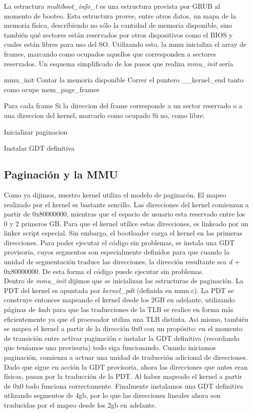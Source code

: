 La estructura \textit{multiboot\_info\_t} es una estructura provista por GRUB al momento de booteo. Esta estructura provee, entre otros datos, un mapa de la memoria física, describiendo 
no sólo la cantidad de memoria disponible, sino también qué sectores están reservados por otros dispositivos como el BIOS y cuales están libres para uso del SO. Utilizando esto, la mmu 
inicializa el array de frames, marcando como ocupados aquellos que corresponden a sectores reservados. Un esquema simplificado de los pasos que realiza \textit{mmu\_init} sería

\begin{verbatimtab}
 mmu_init
      Contar la memoria disponible
      Correr el puntero __kernel_end tanto como ocupe mem_page_frames

      Para cada frame
	  Si la direccion del frame corresponde a un sector reservado
	  o a una direccion del kernel, marcarlo como ocupado
	  Si no, como libre.

      Inicializar paginacion

      Instalar GDT definitiva
\end{verbatimtab}

\subsection{Paginación y la MMU}
Como ya dijimos, nuestro kernel utiliza el modelo de paginacón. El mapeo realizado por el kernel es bastante sencillo. Las direcciones del kernel comienzan a partir de 0x80000000, mientras que 
el espacio de usuario esta reservado entre los 0 y 2 primeros GB. Para que el kernel utilice estas direcciones, es linkeado por un linker script especial. Sin embargo, el bootloader carga 
el kernel en las primeras direcciones. Para poder ejecutar el código sin problemas, se instala una GDT provisoria, cuyos segmentos son especialmente definidos para que cuando la unidad de segmentación 
traduce las direcciones, la dirección resultante sea \textit{d} + 0x80000000. De esta forma el código puede ejecutar sin problemas.\\
Dentro de \textit{mmu\_init} dijimos que se inicializan las estructuras de paginación. La PDT del kernel es apuntada por \textit{kernel\_pdt} (definida en mmu.c). La PDT se construye entonces 
mapeando el kernel desde los 2GB en adelante, utilizando páginas de 4mb para que las traducciones de la TLB se realice en forma más eficientemente ya que el procesador utiliza una TLB distinta.
Asi mismo, también se mapea el kernel a partir de la dirección 0x0 con un propósito: en el momento de transición entre activar paginación e instalar la GDT definitiva (recordando que teníamos una provisoria) 
todo siga funcionando. Cuando iniciamos paginación, comienza a actuar una unidad de traducción adicional de direcciones. Dado que sigue en acción la GDT provisoria, ahora las direcciones que antes 
eran físicas, pasan por la traducción de la PDT. Al haber mapeado el kernel a partir de 0x0 todo funciona correctamente. Finalmente instalamos una GDT definitiva utlizando segmentos de 4gb, por lo que 
las direcciones lineales ahora son traducidas por el mapeo desde los 2gb en adelante.


